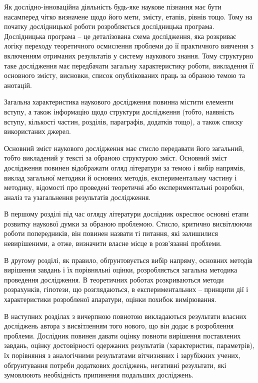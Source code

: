 Як дослідно-інноваційна діяльність будь-яке наукове пізнання має бути
насамперед чітко визначене щодо його мети, змісту, етапів, рівнів тощо. Тому
на початку дослідницької роботи розробляється дослідницька програма.
Дослідницька програма – це деталізована схема дослідження, яка розкриває
логіку переходу теоретичного осмислення проблеми до її практичного
вивчення з включенням отриманих результатів у систему наукового знання.
Тому структурно таке дослідження має передбачати загальну характеристику
роботи, викладення її основного змісту, висновки, список опублікованих праць
за обраною темою та анотацій.

Загальна характеристика наукового дослідження повинна містити елементи
вступу, а також інформацію щодо структури дослідження (тобто, наявність
вступу, кількості частин, розділів, параграфів, додатків тощо), а також списку
використаних джерел.

Основний зміст наукового дослідження має стисло передавати його
загальний, тобто викладений у тексті за обраною структурою зміст. Основний
зміст дослідження повинен відображати огляд літератури за темою і вибір
напрямів, виклад загальної методики й основних методів, експериментальну
частину і методику, відомості про проведені теоретичні або експериментальні
розробки, аналіз та узагальнення результатів дослідження.

В першому розділі під час огляду літератури дослідник окреслює основні
етапи розвитку наукової думки за обраною проблемою. Стисло, критично
висвітлюючи роботи попередників, він повинен назвати ті питання, які
залишилися невирішеними, а отже, визначити власне місце в розв’язанні
проблеми.

В другому розділі, як правило, обґрунтовується вибір напряму, основних
методів вирішення завдань і їх порівняльні оцінки, розробляється загальна
методика проведення дослідження. В теоретичних роботах розкриваються
методи розрахунків, гіпотези, що розглядаються, в експериментальних –
принципи дії і характеристики розробленої апаратури, оцінки похибок
вимірювання.

В наступних розділах з вичерпною повнотою викладаються результати
власних досліджень автора з висвітленням того нового, що він додає в
розроблення проблеми. Дослідник повинен давати оцінку повноти вирішення
поставлених завдань, оцінку достовірності одержаних результатів
(характеристик, параметрів), їх порівняння з аналогічними результатами
вітчизняних і зарубіжних учених, обґрунтування потреби додаткових
досліджень, негативні результати, які зумовлюють необхідність припинення
подальших досліджень.

